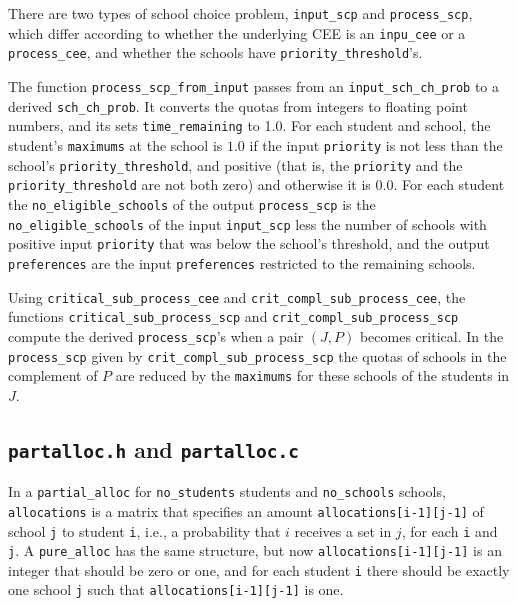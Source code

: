 \documentclass[12pt]{article}
\theoremstyle{definition}
\begin{document}
\begin{appendix}
There are two types of school choice problem, \texttt{input\_scp} and
\texttt{process\_scp}, which differ according to whether the
underlying CEE is an \texttt{inpu\_cee} or a \texttt{process\_cee},
and whether the schools have \texttt{priority\_threshold}'s.

The function \texttt{process\_scp\_from\_input} passes from an
\texttt{input\_sch\_ch\_prob} to a derived \texttt{sch\_ch\_prob}.  It
converts the quotas from integers to floating point numbers, and its
sets \texttt{time\_remaining} to 1.0.  For each student and school,
the student's \texttt{maximums} at the school is $1.0$ if the input
\texttt{priority} is not less than the school's
\texttt{priority\_threshold}, and positive (that is, the
\texttt{priority} and the \texttt{priority\_threshold} are not both
zero) and otherwise it is $0.0$.  For each student the
\texttt{no\_eligible\_schools} of the output \texttt{process\_scp} is
the \texttt{no\_eligible\_schools} of the input \texttt{input\_scp}
less the number of schools with positive input \texttt{priority} that
was below the school's threshold, and the output \texttt{preferences}
are the input \texttt{preferences} restricted to the remaining
schools.

Using \texttt{critical\_sub\_process\_cee} and
\texttt{crit\_compl\_sub\_process\_cee}, the functions
\texttt{critical\_sub\_process\_scp} and
\texttt{crit\_compl\_sub\_process\_scp} compute the derived
\texttt{process\_scp}'s when a pair $(J,P)$ becomes critical.  In the
\texttt{process\_scp} given by \texttt{crit\_compl\_sub\_process\_scp}
the quotas of schools in the complement of $P$ are reduced by the
\texttt{maximums} for these schools of the students in $J$.

\subsection{\texttt{partalloc.h} and \texttt{partalloc.c}}

In a \texttt{partial\_alloc} for \texttt{no\_students} students and
\texttt{no\_schools} schools, \texttt{allocations} is a matrix that
specifies an amount \texttt{allocations[i-1][j-1]} of school
\texttt{j} to student \texttt{i}, i.e., a probability that $i$
receives a set in $j$, for each \texttt{i} and \texttt{j}.  A
\texttt{pure\_alloc} has the same structure, but now
\texttt{allocations[i-1][j-1]} is an integer that should be zero or
one, and for each student \texttt{i} there should be exactly one
school \texttt{j} such that \texttt{allocations[i-1][j-1]} is one.


\end{appendix}
\end{document}
